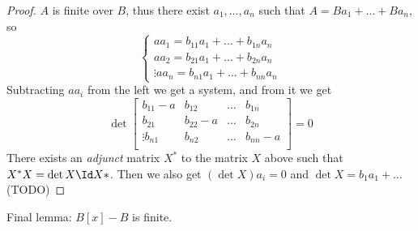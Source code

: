 \documentclass[12pt]{article}
\begin{document}
    \begin{proof}
        $A$ is finite over $B$, thus there exist $a_1, \dots, a_n$ such that $A = Ba_1 + \dots + Ba_n$, so 
        $$\begin{cases}
            aa_1 = b_{11}a_1 + \dots + b_{1n}a_n \\
            aa_2 = b_{21}a_1 + \dots + b_{2n}a_n \\
            \vdots 
            aa_n = b_{n1}a_1 + \dots + b_{nn}a_n
        \end{cases}
        $$
        Subtracting $aa_i$ from the left we get a system, and from it we get 
        $$\det \begin{bmatrix}
            b_{11}-a & b_{12} & \dots & b_{1n} \\
            b_{21} & b_{22}-a & \dots & b_{2n} \\
            \vdots
            b_{n1} & b_{n2} & \dots & b_{nn}-a \\
        \end{bmatrix} = 0$$
        There exists an \textit{adjunct} matrix $X^*$ to the matrix $X$ above such that $X^*X = \det X \Id X*$. Then we also get 
        $(\det X)a_i = 0$ and $\det X = b_1a_1 + \dots $ (TODO) 
    \end{proof}
    Final lemma: $B[x] - B$ is finite.
\end{document}
